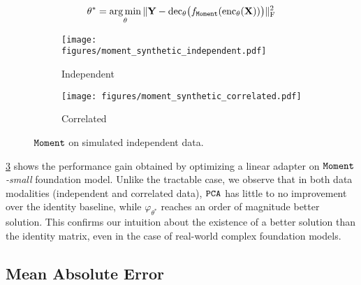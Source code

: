 \begin{equation}
\label{eq:theta}
    \theta^* = \operatorname*{arg\,min}_\theta \|\mathbf{Y} - \mathrm{dec}_\theta \big( f_{\text{$\texttt{Moment}$}}(\mathrm{enc}_\theta (\mathbf{X})) \big)\|_{\mathrm{F}}^2
\end{equation}

\begin{figure}
     \centering
     \begin{subfigure}[b]{0.49\textwidth}
         \centering
        \texttt{[image: figures/moment\_synthetic\_independent.pdf]}
         \caption{Independent}
         \label{fig:indp}
     \end{subfigure}
     \hfill
     \begin{subfigure}[b]{0.49\textwidth}
         \centering
        \texttt{[image: figures/moment\_synthetic\_correlated.pdf]}
         \caption{Correlated}
         \label{fig:corr}
     \end{subfigure}
        \caption{$\texttt{Moment}$ on simulated independent data.}
        \label{fig:moment_synthetic}
\end{figure}

\cref{fig:moment_synthetic} shows the performance gain obtained by optimizing a linear adapter on \emph{$\texttt{Moment}$-small} foundation model. Unlike the tractable case, we observe that in both data modalities (independent and correlated data), $\texttt{PCA}$ has little to no improvement over the identity baseline, while $\varphi_{\theta^*}$ reaches an order of magnitude better solution. This confirms our intuition about the existence of a better solution than the identity matrix, even in the case of real-world complex foundation models.



\subsection{Mean Absolute Error}

